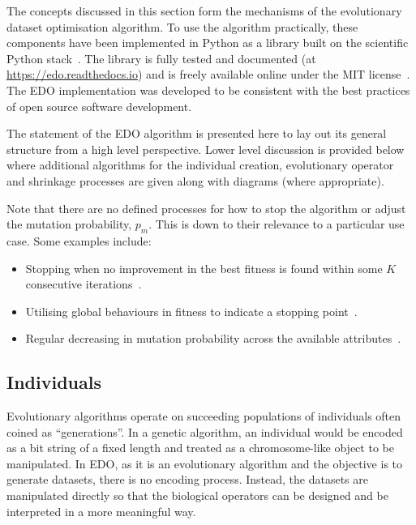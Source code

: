 The concepts discussed in this section form the mechanisms of the evolutionary
dataset optimisation algorithm. To use the algorithm practically, these
components have been implemented in Python as a library built on the scientific
Python stack~\cite{pandas,numpy}. The library is fully tested and documented (at
\url{https://edo.readthedocs.io}) and is freely available online under the MIT
license~\cite{edo-project}. The EDO implementation was developed to be
consistent with the best practices of open source software development.

\label{alg:edo}


The statement of the EDO algorithm is presented here to lay out its general
structure from a high level perspective. Lower level discussion is provided
below where additional algorithms for the individual creation, evolutionary
operator and shrinkage processes are given along with diagrams (where
appropriate).

Note that there are no defined processes for how to stop the algorithm or adjust
the mutation probability, \(p_m\). This is down to their relevance to a
particular use case. Some examples include:

\begin{itemize}
    \item Stopping when no improvement in the best fitness is found within some
        \(K\) consecutive iterations~\cite{Leung2001}.
    \item Utilising global behaviours in fitness to indicate a stopping
        point~\cite{Marti2016}.
    \item Regular decreasing in mutation probability across the available
        attributes~\cite{Kuehn2013}.
\end{itemize}

\subsection{Individuals}

Evolutionary algorithms operate on succeeding populations of individuals often
coined as ``generations''. In a genetic algorithm, an individual would be
encoded as a bit string of a fixed length and treated as a chromosome-like
object to be manipulated. In EDO, as it is an evolutionary algorithm and the
objective is to generate datasets, there is no encoding process. Instead, the
datasets are manipulated directly so that the biological operators can be
designed and be interpreted in a more meaningful way.

